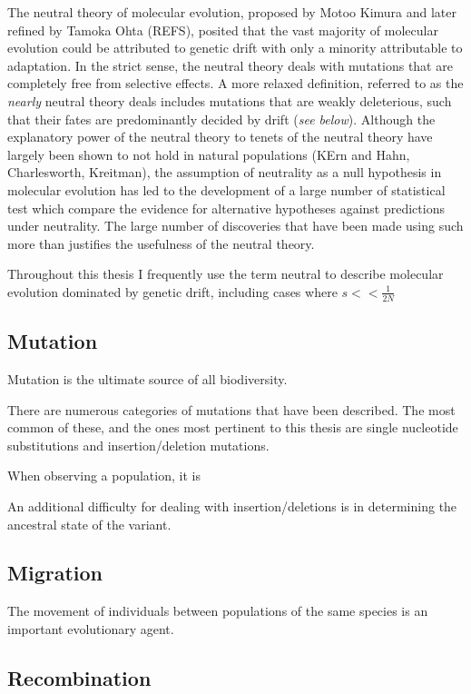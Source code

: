 	The neutral theory of molecular evolution, proposed by Motoo Kimura and later refined by Tamoka Ohta (REFS), posited that the vast majority of molecular evolution could be attributed to genetic drift with only a minority attributable to adaptation. In the strict sense, the neutral theory deals with mutations that are completely free from selective effects. A more relaxed definition, referred to as the \textit{nearly} neutral theory deals includes mutations that are weakly deleterious, such that their fates are predominantly decided by drift (\textit{see below}). Although the explanatory power of the neutral theory to  tenets of the neutral theory have largely been shown to not hold in natural populations (KErn and Hahn, Charlesworth, Kreitman), the assumption of neutrality as a null hypothesis in molecular evolution has led to the development of a large number of statistical test which compare the evidence for alternative hypotheses against predictions under neutrality. The large number of discoveries that have been made using such more than justifies the usefulness of the neutral theory. 
	
	Throughout this thesis I frequently use the term neutral to describe molecular evolution dominated by genetic drift, including cases where $s << \frac{1}{2N}$
	
\subsection{Mutation}

	Mutation is the ultimate source of all biodiversity.
	
	There are numerous categories of mutations that have been described. The most common of these, and the ones most pertinent to this thesis are single nucleotide substitutions and insertion/deletion mutations.
	
	When observing a population, it is 	
	
	An additional difficulty for dealing with insertion/deletions is in determining the ancestral state of the variant.
	
\subsection{Migration}

	The movement of individuals between populations of the same species is an important evolutionary agent. 
	
	
	
\subsection{Recombination}

